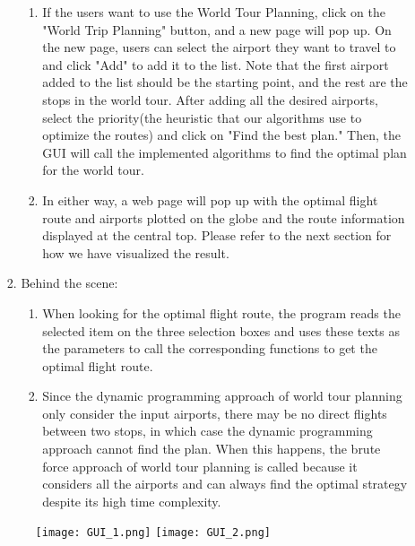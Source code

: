 \documentclass[fontsize=11pt]{article}
\begin{document}
\begin{enumerate}
\begin{enumerate}
\begin{enumerate}
\begin{enumerate}
                        \item If the users want to use the World Tour Planning, click on the "World Trip Planning" button, and a new page will pop up. On the new page, users can select the airport they want to travel to and click "Add" to add it to the list. Note that the first airport added to the list should be the starting point, and the rest are the stops in the world tour. After adding all the desired airports, select the priority(the heuristic that our algorithms use to optimize the routes) and click on "Find the best plan." Then, the GUI will call the implemented algorithms to find the optimal plan for the world tour.
                        \item In either way, a web page will pop up with the optimal flight route and airports plotted on the globe and the route information displayed at the central top. Please refer to the next section for how we have visualized the result.
                        \end{enumerate}
                    \item Behind the scene:
                    \begin{enumerate}
                        \item When looking for the optimal flight route, the program reads the selected item on the three selection boxes and uses these texts as the parameters to call the corresponding functions to get the optimal flight route.
                        \item Since the dynamic programming approach of world tour planning only consider the input airports, there may be no direct flights between two stops, in which case the dynamic programming approach cannot find the plan. When this happens, the brute force approach of world tour planning is called because it considers all the airports and can always find the optimal strategy despite its high time complexity.
                    \end{enumerate}
                \end{enumerate}
            \begin{figure}[h]
                \centering
                \texttt{[image: GUI\_1.png]}
                \texttt{[image: GUI\_2.png]}
            \end{figure}
                

\end{enumerate}
\end{enumerate}
\end{document}

